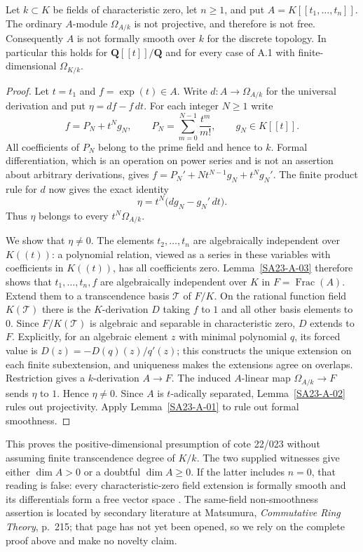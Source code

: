 \begin{theorem}\label{SA23-A-04}
Let $k\subset K$ be fields of characteristic zero, let $n\geq1$, and
put $A=K[[t_1,\ldots,t_n]]$.  The ordinary $A$-module $\Omega_{A/k}$
is not projective, and therefore is not free.  Consequently $A$ is
not formally smooth over $k$ for the discrete topology.  In
particular this holds for $\mathbf Q[[t]]/\mathbf Q$ and for every
case of A.1 with finite-dimensional $\Omega_{K/k}$.
\end{theorem}
\begin{proof}
Let $t=t_1$ and $f=\exp(t)\in A$.  Write $d:A\to\Omega_{A/k}$
for the universal derivation and put $\eta=df-f\,dt$.
For each integer $N\geq1$ write
\[
 f=P_N+t^Ng_N,\qquad
 P_N=\sum_{m=0}^{N-1}\frac{t^m}{m!},\qquad g_N\in K[[t]].
\]
All coefficients of $P_N$ belong to the prime field and hence to $k$.
Formal differentiation, which is an operation on power series and is
not an assertion about arbitrary derivations, gives
$f=P_N'+Nt^{N-1}g_N+t^Ng_N'$.  The finite product rule for $d$ now
gives the exact identity
\[
 \eta=t^N\bigl(dg_N-g_N'\,dt\bigr).
\]
Thus $\eta$ belongs to every $t^N\Omega_{A/k}$.

We show that $\eta\ne0$.  The elements $t_2,\ldots,t_n$ are
algebraically independent over $K((t))$: a polynomial relation, viewed
as a series in these variables with coefficients in $K((t))$, has
all coefficients zero.  Lemma~\ref{SA23-A-03} therefore shows that
$t_1,\ldots,t_n,f$ are algebraically independent over $K$ in
$F=\operatorname{Frac}(A)$.  Extend them to a transcendence basis
$\mathcal T$ of $F/K$.  On the rational function field $K(\mathcal T)$
there is the $K$-derivation $D$ taking $f$ to $1$ and all other basis
elements to $0$.  Since $F/K(\mathcal T)$ is algebraic and
separable in characteristic zero, $D$ extends to $F$.  Explicitly,
for an algebraic element $z$ with minimal polynomial $q$, its forced
value is $D(z)=-D(q)(z)/q'(z)$; this constructs the unique extension
on each finite subextension, and uniqueness makes the extensions
agree on overlaps.  Restriction gives a $k$-derivation $A\to F$.
The induced $A$-linear map $\Omega_{A/k}\to F$ sends $\eta$ to $1$.
Hence $\eta\ne0$.  Since $A$ is $t$-adically separated,
Lemma~\ref{SA23-A-02} rules out projectivity.  Apply
Lemma~\ref{SA23-A-01} to rule out formal smoothness.
\end{proof}

\begin{remark}\label{SA23-A-05}
This proves the positive-dimensional presumption of cote 22/023
without assuming finite transcendence degree of $K/k$.  The two
supplied witnesses give either $\dim A>0$ or a doubtful
$\dim A\geq0$.  If the latter includes $n=0$, that reading is false:
every characteristic-zero field extension is formally smooth and
its differentials form a free vector space
\cite[Tag 031U, Proposition 10.158.9]{rootStacksFields}.
The same-field non-smoothness assertion is located by secondary
literature at Matsumura, \emph{Commutative Ring Theory}, p.~215;
that page has not yet been opened, so we rely on the complete proof
above and make no novelty claim.
\end{remark}

